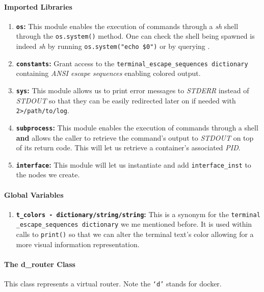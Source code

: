     \paragraph{Imported Libraries}
        \begin{enumerate}
            \item \textbf{\texttt{os}:} This module enables the execution of commands through a \textit{sh} shell through the \texttt{os.system()} method. One can check the shell being spawned is indeed \textit{sh} by running \texttt{\allowbreak os.system("echo \$0")} or by querying \cite{bib:man-system}.
            \item \textbf{\texttt{constants}:} Grant access to the \texttt{\allowbreak terminal\_escape\_sequences dictionary} containing \textit{ANSI escape sequences} enabling colored output.
            \item \textbf{\texttt{sys}:} This module allows us to print error messages to \textit{STDERR} instead of \textit{STDOUT} so that they can be easily redirected later on if needed with \texttt{2>/path/to/log}.
            \item \textbf{\texttt{subprocess}:} This module enables the execution of commands through a shell \textbf{and} allows the caller to retrieve the command's output to \textit{STDOUT} on top of its return code. This will let us retrieve a container's associated \textit{PID}.
            \item \textbf{\texttt{interface}:} This module will let us instantiate and add \texttt{interface\_inst} to the nodes we create.
        \end{enumerate}

    \paragraph{Global Variables}
        \begin{enumerate}
            \item \textbf{\texttt{\allowbreak t\_colors - dictionary/string/string}:} This is a synonym for the \texttt{\allowbreak terminal \_escape\_sequences dictionary} we me mentioned before. It is used within calls to \texttt{print()} so that we can alter the terminal text's color allowing for a more visual information representation.
        \end{enumerate}

    \paragraph{The d\_router Class}
        This class represents a virtual router. Note the \texttt{`d'} stands for docker.


